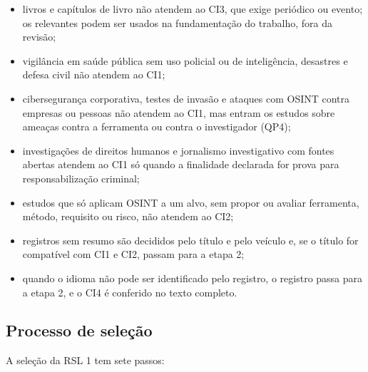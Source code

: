 \begin{itemize}
	\item livros e capítulos de livro não atendem ao CI3, que exige periódico
	ou evento; os relevantes podem ser usados na fundamentação do trabalho,
	fora da revisão;
	\item vigilância em saúde pública sem uso policial ou de inteligência,
	desastres e defesa civil não atendem ao CI1;
	\item cibersegurança corporativa, testes de invasão e ataques com OSINT
	contra empresas ou pessoas não atendem ao CI1, mas entram os estudos sobre
	ameaças contra a ferramenta ou contra o investigador (QP4);
	\item investigações de direitos humanos e jornalismo investigativo com
	fontes abertas atendem ao CI1 só quando a finalidade declarada for prova
	para responsabilização criminal;
	\item estudos que só aplicam OSINT a um alvo, sem propor ou avaliar
	ferramenta, método, requisito ou risco, não atendem ao CI2;
	\item registros sem resumo são decididos pelo título e pelo veículo e, se
	o título for compatível com CI1 e CI2, passam para a etapa 2;
	\item quando o idioma não pode ser identificado pelo registro, o registro
	passa para a etapa 2, e o CI4 é conferido no texto completo.
\end{itemize}


\subsection{Processo de seleção}
\label{sec:metodologia-selecao}

A seleção da RSL 1 tem sete passos:

